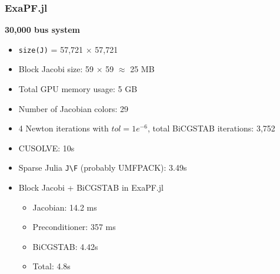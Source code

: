 \begin{frame}[fragile]
  \frametitle{ExaPF.jl}
  {\bf 30,000 bus system}
  \begin{itemize}
    \item \lstinline{size(J)} = 57,721 $\times$ 57,721 
    \item Block Jacobi size: 59 $\times$ 59 $\approx$ 25 MB
    \item Total GPU memory usage: 5 GB
    \item Number of Jacobian colors: 29
    \item 4 Newton iterations with $tol = 1e^{-6}$, total BiCGSTAB iterations: 3,752 
    \item CUSOLVE: 10s 
    \item Sparse Julia \lstinline{J\F} (probably UMFPACK): 3.49s 
    \item Block Jacobi + BiCGSTAB in ExaPF.jl
    \begin{itemize}
      \item Jacobian: 14.2 ms
      \item Preconditioner: 357 ms
      \item BiCGSTAB: 4.42s
      \item Total: 4.8s
    \end{itemize}
  \end{itemize}
\end{frame}



